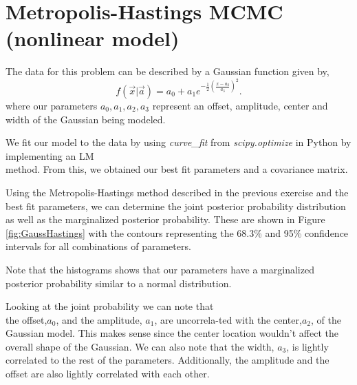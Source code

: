 \section{Metropolis-Hastings MCMC (nonlinear model)}

The data for this problem can be described by a Gaussian function given by,
\begin{equation}
    f(\Vec{x}|\Vec{a})=a_0+a_1e^{-\frac{1}{2}(\frac{x-a_2}{a_3})^2}.
    \label{eq:GaussModel}
\end{equation}
where our parameters $a_0,a_1,a_2,a_3$ represent an offset, amplitude, center and width of the Gaussian being modeled.

We fit our model to the data by using \emph{curve\_fit} from \emph{scipy.optimize} in Python by implementing an LM \\method.
From this, we obtained our best fit parameters and a covariance matrix. 

Using the Metropolis-Hastings method described in the previous exercise and the best fit parameters, we can determine the joint posterior probability distribution as well as the marginalized posterior probability. 
These are shown in Figure \ref{fig:GaussHastings} with the contours representing the 68.3\% and 95\% confidence intervals for all combinations of parameters.

Note that the histograms shows that our parameters have a marginalized posterior probability similar to a normal distribution. 

Looking at the joint probability we can note that \\the offset,$a_0$, and the amplitude, $a_1$, are uncorrela-ted with the center,$a_2$, of the Gaussian model. 
This makes sense since the center location wouldn't affect the overall shape of the Gaussian. We can also note that the width, $a_3$, is lightly correlated to the rest of the parameters.
Additionally, the amplitude and the offset are also lightly correlated with each other. 


